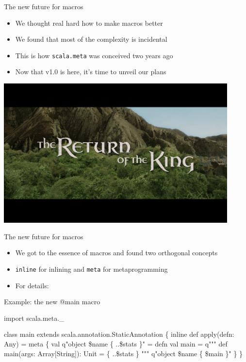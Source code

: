 \documentclass[svgnames,dvipsnames,hyperref={bookmarks=false},usepdftitle=false]{beamer}
\begin{document}
\begin{frame}{The new future for macros}
\begin{itemize}
\item We thought real hard how to make macros better
\item We found that most of the complexity is incidental
\item This is how \texttt{scala.meta} was conceived two years ago
\item Now that v1.0 is here, it's time to unveil our plans
\end{itemize}
\end{frame}

{
  \begin{frame}{}
  \vskip20pt
  \begin{center}
  \includegraphics[height=7.6cm]{return-of-the-king.png}
  \end{center}
  \end{frame}
}

\begin{frame}{The new future for macros}
\begin{itemize}
\item We got to the essence of macros and found two orthogonal concepts
\item \texttt{inline} for inlining and \texttt{meta} for metaprogramming
\item For details: 
\end{itemize}
\end{frame}

\begin{frame}[fragile]{Example: the new @main macro}
\begin{semiverbatim}
import scala.meta._

class main extends scala.annotation.StaticAnnotation \{
  inline def apply(defn: Any) = meta \{
    val q"object \$name \{ ..\$stats \}" = defn
    val main = q"""
      def main(args: Array[String]): Unit = \{ ..\$stats \}
    """
    q"object \$name \{ \$main \}"
  \}
\}
\end{semiverbatim}
\end{frame}
\end{document}
